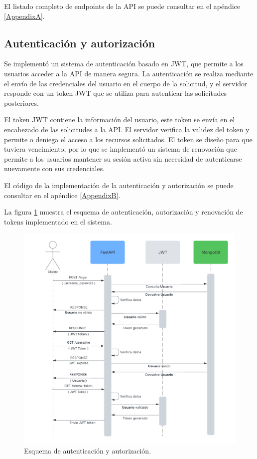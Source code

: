 El listado completo de endpoints de la API se puede consultar en el apéndice
\ref{AppendixA}.

\subsection{Autenticación y autorización}

Se implementó un sistema de autenticación basado en JWT, que permite a los
usuarios acceder a la API de manera segura. La autenticación se realiza
mediante el envío de las credenciales del usuario en el cuerpo de la solicitud,
y el servidor responde con un token JWT que se utiliza para autenticar las
solicitudes posteriores.

El token JWT contiene la información del usuario, este token se envía en el
encabezado de las solicitudes a la API. El servidor verifica la validez del
token y permite o deniega el acceso a los recursos solicitados. El token se
diseño para que tuviera vencimiento, por lo que se implementó un sistema de
renovación que permite a los usuarios mantener su sesión activa sin necesidad
de autenticarse nuevamente con sus credenciales.

El código de la implementación de la autenticación y autorización se puede
consultar en el apéndice \ref{AppendixB}.

La figura \ref{fig:esquema autenticacion} muestra el esquema de autenticación,
autorización y renovación de tokens implementado en el sistema.

\begin{figure}[H]
    \centering
    \includegraphics[width=.99\textwidth]{./Images/17.png}
    \caption{Esquema de autenticación y autorización.}
    \label{fig:esquema autenticacion}
\end{figure}

